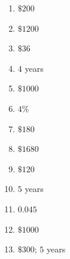 \documentclass[11pt]{article}
\begin{document}
\begin{keybox}
\begin{multicols}{2}
\small
\begin{enumerate}[leftmargin=*,itemsep=3pt]
  \item $\$200$
  \item $\$1200$
  \item $\$36$
  \item $4$ years
  \item $\$1000$
  \item $4\%$
  \item $\$180$
  \item $\$1680$
  \item $\$120$
  \item $5$ years
  \item $0.045$
  \item $\$1000$
  \item $\$300$; $5$ years
\end{enumerate}
\end{multicols}
\end{keybox}
\end{document}
